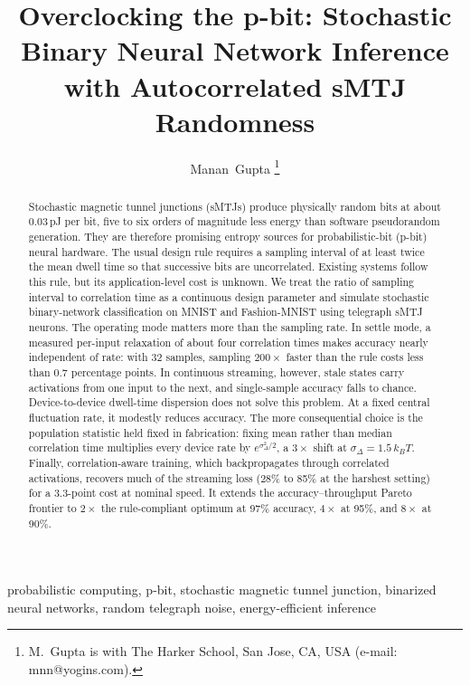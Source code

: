 \documentclass[journal]{IEEEtran}
\begin{document}
\title{Overclocking the p-bit: Stochastic Binary Neural Network Inference
with Autocorrelated sMTJ Randomness}

\author{Manan~Gupta%
\thanks{M.~Gupta is with The Harker School, San Jose, CA, USA
(e-mail: mnn@yogins.com).}}

\maketitle

\begin{abstract}
Stochastic magnetic tunnel junctions (sMTJs) produce physically random bits
at about 0.03\,pJ per bit, five to six orders of magnitude less energy than
software pseudorandom generation. They are therefore promising entropy
sources for probabilistic-bit (p-bit) neural hardware. The usual design rule
requires a sampling interval of at least twice the mean dwell time so that
successive bits are uncorrelated. Existing systems follow this rule, but its
application-level cost is unknown. We treat the ratio of sampling interval to
correlation time as a continuous design parameter and simulate stochastic
binary-network classification on MNIST and Fashion-MNIST using telegraph
sMTJ neurons. The operating mode matters more than the sampling rate. In
settle mode, a measured per-input relaxation of about four correlation times
makes accuracy nearly independent of rate: with 32 samples, sampling
$200\times$ faster than the rule costs less than 0.7 percentage points. In
continuous streaming, however, stale states carry activations from one input
to the next, and single-sample accuracy falls to chance. Device-to-device
dwell-time dispersion does not solve this problem. At a fixed central
fluctuation rate, it modestly reduces accuracy. The more consequential choice
is the population statistic held fixed in fabrication: fixing mean rather
than median correlation time multiplies every device rate by
$e^{\sigma_\Delta^2/2}$, a $3\times$ shift at $\sigma_\Delta=1.5\,k_BT$.
Finally, correlation-aware training, which backpropagates through
correlated activations, recovers much of the streaming loss (28\% to 85\%
at the harshest setting) for a 3.3-point cost at nominal speed. It extends
the accuracy--throughput Pareto frontier to $2\times$ the rule-compliant
optimum at 97\% accuracy, $4\times$ at 95\%, and $8\times$ at 90\%.
\end{abstract}

\begin{IEEEkeywords}
probabilistic computing, p-bit, stochastic magnetic tunnel junction,
binarized neural networks, random telegraph noise, energy-efficient inference
\end{IEEEkeywords}
\end{document}
